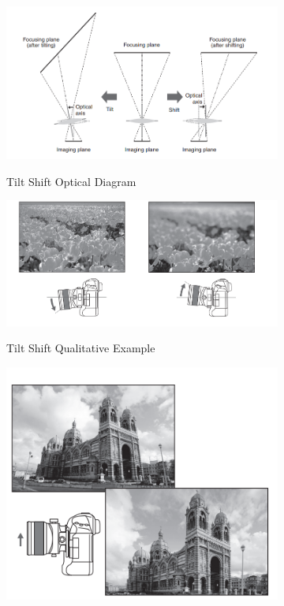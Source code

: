 \begin{figure}[ht!]
    \centering
    \specialrule{0.01em}{1em}{1em}
\begin{subfigure}[b]{0.5\textwidth}
    \includegraphics[width=\textwidth]{figures/appendix/tilt_shif_example.png}
    \label{tilt_diagram}
    \caption{Tilt Shift Optical Diagram}
\end{subfigure}
\hspace{5mm}
\begin{subfigure}[b]{0.5\textwidth}
\includegraphics[width=\textwidth]{figures/appendix/tilteffect.png}
\label{tilt quality eg 1}
\caption{Tilt Shift Qualitative Example}
\end{subfigure}
\hspace{5mm}
\begin{subfigure}[b]{0.5\textwidth}
\includegraphics[width=\textwidth]{figures/appendix/shifteffect1.png}

\end{subfigure}
\end{figure}
